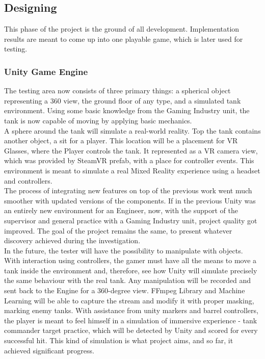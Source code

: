 \subsection{Designing}
This phase of the project is the ground of all development.
Implementation results are meant to come up into one playable game, which is later used for testing.
\subsubsection{Unity Game Engine}
The testing area now consists of three primary things: a spherical object representing a 360 view, the ground floor of any type, and a simulated tank environment.
Using some basic knowledge from the Gaming Industry unit, the tank is now capable of moving by applying basic mechanics.\\
A sphere around the tank will simulate a real-world reality.
Top the tank contains another object, a sit for a player.
This location will be a placement for VR Glasses, where the Player controls the tank.
It represented as a VR camera view, which was provided by SteamVR prefab, with a place for controller events.
This environment is meant to simulate a real Mixed Reality experience using a headset and controllers.\\[1pc]
The process of integrating new features on top of the previous work went much smoother with updated versions of the components. 
If in the previous Unity was an entirely new environment for an Engineer, now, with the support of the supervisor and general practice with a Gaming Industry unit, project quality got improved.
The goal of the project remains the same, to present whatever discovery achieved during the investigation.\\[1pc]
In the future, the tester will have the possibility to manipulate with objects.
With interaction using controllers, the gamer must have all the means to move a tank inside the environment and, therefore, see how Unity will simulate precisely the same behaviour with the real tank.
Any manipulation will be recorded and sent back to the Engine for a 360-degree view.
FFmpeg Library and Machine Learning will be able to capture the stream and modify it with proper masking, marking enemy tanks.
With assistance from unity markers and barrel controllers, the player is meant to feel himself in a simulation of immersive experience - tank commander target practice, which will be detected by Unity and scored for every successful hit.
This kind of simulation is what project aims, and so far, it achieved significant progress.
